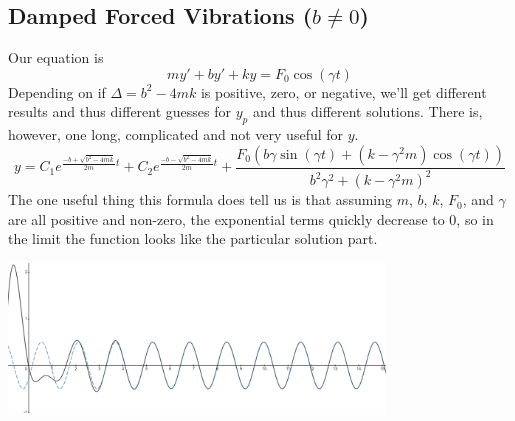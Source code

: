 \subsection{Damped Forced Vibrations ($b \neq 0$)}
\noindent
Our equation is 
\begin{equation*}
	my' + by' + ky = F_0\cos{(\gamma t)}
\end{equation*}
Depending on if $\Delta = b^2 - 4mk$ is positive, zero, or negative, we'll get different results and thus different guesses for $y_p$ and thus different solutions. There is, however, one long, complicated and not very useful for $y$.
\begin{equation*}
	y = C_1e^{\frac{-b+\sqrt{b^2-4mk}}{2m}t} + C_2e^{\frac{-b-\sqrt{b^2-4mk}}{2m}t} +
	 \frac{F_0\left(b\gamma\sin{(\gamma t)} + \left(k-\gamma^2m\right)\cos{(\gamma t)}\right)}{b^2\gamma^2 + (k-\gamma^2m)^2}
\end{equation*}
The one useful thing this formula does tell us is that assuming $m$, $b$, $k$, $F_0$, and $\gamma$ are all positive and non-zero, the exponential terms quickly decrease to 0, so in the limit the function looks like the particular solution part.

\begin{center}
	\includegraphics[width=0.75\textwidth]{./higherOrder/forcedVibrs/damped_forced.png}
\end{center}

\ifodd{}\fi